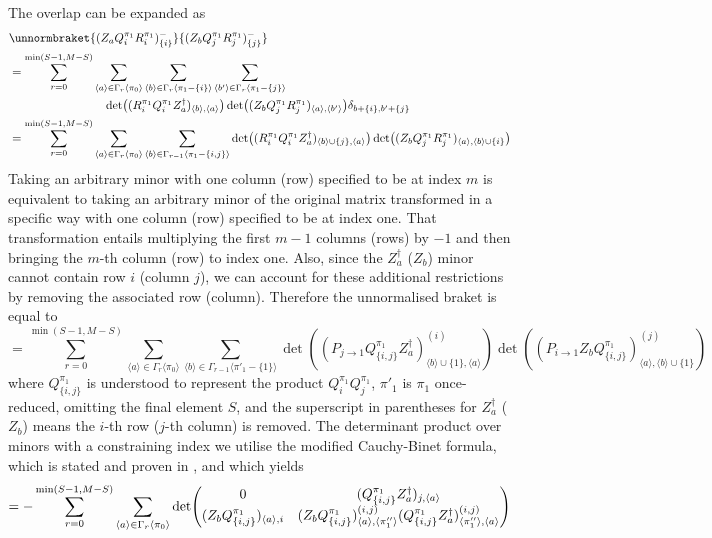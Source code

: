 \documentclass[12pt]{article}
\newcommand{\seq}[1]{\langle #1\rangle}
\newcommand{\hc}{^\dagger}
\begin{document}
	The overlap can be expanded as
	\begin{align*}
	&\unnormbraket{(Z_aQ^{\pi_1}_iR^{\pi_1}_i)^{-}_{\{i\}}}{(Z_bQ^{\pi_1}_jR^{\pi_1}_j)^{-}_{\{j\}}}\\
	&=\sum_{r=0}^{\min(S-1,M-S)}\sum_{\seq{a}\in\Gamma_r\seq{\pi_0}}\sum_{\seq{b}\in\Gamma_r\seq{\pi_1-\{i\}}}\sum_{\seq{b'}\in\Gamma_r\seq{\pi_1-\{j\}}}\\
	&\qquad\qquad\qquad\qquad\det((R^{\pi_1}_iQ^{\pi_1}_iZ_a\hc)_{\seq{b}, \seq{a}})\det((Z_bQ^{\pi_1}_jR^{\pi_1}_j)_{\seq{a},\seq{b'}})\delta_{b+\{i\},b'+\{j\}}\\
	&=\sum_{r=0}^{\min(S-1,M-S)}\sum_{\seq{a}\in\Gamma_r\seq{\pi_0}}\sum_{\seq{b}\in\Gamma_{r-1}\seq{\pi_1-\{i, j\}}}\det((R^{\pi_1}_iQ^{\pi_1}_iZ_a\hc)_{\seq{b}\cup \{j\}, \seq{a}})\det((Z_bQ^{\pi_1}_jR^{\pi_1}_j)_{\seq{a},\seq{b}\cup \{i\}})
	\end{align*}
	Taking an arbitrary minor with one column (row) specified to be at index $m$ is equivalent to taking an arbitrary minor of the original matrix transformed in a specific way with one column (row) specified to be at index one. That transformation entails multiplying the first $m-1$ columns (rows) by $-1$ and then bringing the $m$-th column (row) to index one. Also, since the $Z_a\hc$ ($Z_b$) minor cannot contain row $i$ (column $j$), we can account for these additional restrictions by removing the associated row (column). Therefore the unnormalised braket is equal to
	\begin{equation}
	=\sum_{r=0}^{\min(S-1,M-S)}\sum_{\seq{a}\in\Gamma_r\seq{\pi_0}}\sum_{\seq{b}\in\Gamma_{r-1}\seq{\pi'_1-\{1\}}}\det((P_{j\to 1}Q^{\pi_1}_{\{i,j\}}Z_a\hc)^{(i)}_{\seq{b}\cup \{1\}, \seq{a}})\det((P_{i\to 1}Z_bQ^{\pi_1}_{\{i,j\}})^{(j)}_{\seq{a},\seq{b}\cup \{1\}})
	\end{equation}
	where $Q^{\pi_1}_{\{i,j\}}$ is understood to represent the product $Q^{\pi_1}_iQ^{\pi_1}_j$, $\pi'_1$ is $\pi_1$ once-reduced, omitting the final element $S$, and the superscript in parentheses for $Z_a\hc$ ($Z_b$) means the $i$-th row ($j$-th column) is removed. The determinant product over minors with a constraining index we utilise the modified Cauchy-Binet formula, which is stated and proven in \cite[App. C]{modified_cauchy_binet}, and which yields
	\begin{equation}
	=-\sum_{r=0}^{\min(S-1,M-S)}\sum_{\seq{a}\in\Gamma_r\seq{\pi_0}}\det(\mqty{
		0 & (Q^{\pi_1}_{\{i,j\}}Z_a\hc)_{j, \seq{a}}\\
		(Z_bQ^{\pi_1}_{\{i,j\}})_{\seq{a},i} & (Z_bQ^{\pi_1}_{\{i,j\}})^{(i, j)}_{\seq{a},\seq{\pi''_1}} (Q^{\pi_1}_{\{i,j\}}Z_a\hc)^{(i,j)}_{\seq{\pi''_1}, \seq{a}}
	})
	\end{equation}
\end{document}
